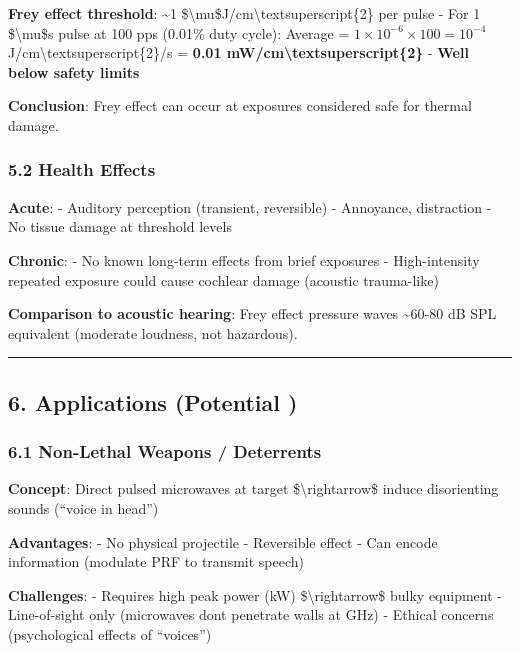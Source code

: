 \textbf{Frey effect threshold}: \textasciitilde1
\$\textbackslash mu\$J/cm\textbackslash textsuperscript\{2\} per pulse -
For 1 \$\textbackslash mu\$s pulse at 100 pps (0.01\% duty cycle):
Average = \(1 \times 10^{-6} \times 100 = 10^{-4}\)
J/cm\textbackslash textsuperscript\{2\}/s = \textbf{0.01
mW/cm\textbackslash textsuperscript\{2\}} - \textbf{Well below safety
limits}

\textbf{Conclusion}: Frey effect can occur at exposures considered safe
for thermal damage.

\subsubsection{5.2 Health Effects}\label{health-effects}

\textbf{Acute}: - Auditory perception (transient, reversible) -
Annoyance, distraction - No tissue damage at threshold levels

\textbf{Chronic}: - No known long-term effects from brief exposures -
High-intensity repeated exposure could cause cochlear damage (acoustic
trauma-like)

\textbf{Comparison to acoustic hearing}: Frey effect pressure waves
\textasciitilde60-80 dB SPL equivalent (moderate loudness, not
hazardous).

\begin{center}\rule{0.5\linewidth}{0.5pt}\end{center}

\subsection{6. Applications (Potential )}\label{applications-potential}

\subsubsection{6.1 Non-Lethal Weapons /
Deterrents}\label{non-lethal-weapons-deterrents}

\textbf{Concept}: Direct pulsed microwaves at target
\$\textbackslash rightarrow\$ induce disorienting sounds (``voice in
head'')

\textbf{Advantages}: - No physical projectile - Reversible effect - Can
encode information (modulate PRF to transmit speech)

\textbf{Challenges}: - Requires high peak power (kW)
\$\textbackslash rightarrow\$ bulky equipment - Line-of-sight only
(microwaves don\textquotesingle t penetrate walls at GHz) - Ethical
concerns (psychological effects of ``voices'')

